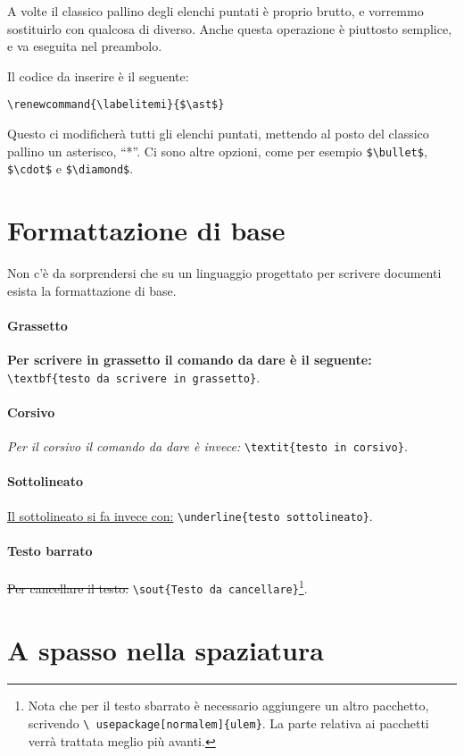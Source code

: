 A volte il classico pallino degli elenchi puntati è proprio brutto, e vorremmo 
sostituirlo con qualcosa di diverso.
Anche questa operazione è piuttosto semplice, e va eseguita nel preambolo.

\noindent Il codice da inserire è il seguente:

\verb!\renewcommand{\labelitemi}{$\ast$}!

\noindent Questo ci modificherà tutti gli elenchi puntati, mettendo al posto 
del classico pallino un asterisco, ``*''. Ci sono altre opzioni, come per 
esempio \verb!$\bullet$!, \verb!$\cdot$! e \verb!$\diamond$!.

\section{Formattazione di base}

Non c'è da sorprendersi che su un linguaggio progettato per scrivere documenti 
esista la formattazione di base.

\paragraph*{Grassetto} \textbf{Per scrivere in grassetto il comando da dare è 
il seguente: }\verb!\textbf{testo da scrivere in grassetto}!.

\paragraph*{Corsivo} \textit{Per il corsivo il comando da dare è invece: }
\verb!\textit{testo in corsivo}!.

\paragraph*{Sottolineato} \underline{Il sottolineato si fa invece con:} 
\verb!\underline{testo sottolineato}!.

\paragraph*{Testo barrato} \sout{Per cancellare il testo: }
\verb!\sout{Testo da cancellare}!\footnote{Nota che per il testo sbarrato è 
necessario aggiungere un altro pacchetto, scrivendo \texttt{\textbackslash 
usepackage[normalem]\{ulem\}}. La parte relativa ai pacchetti verrà trattata 
meglio più avanti.}.

\section{A spasso nella spaziatura}

